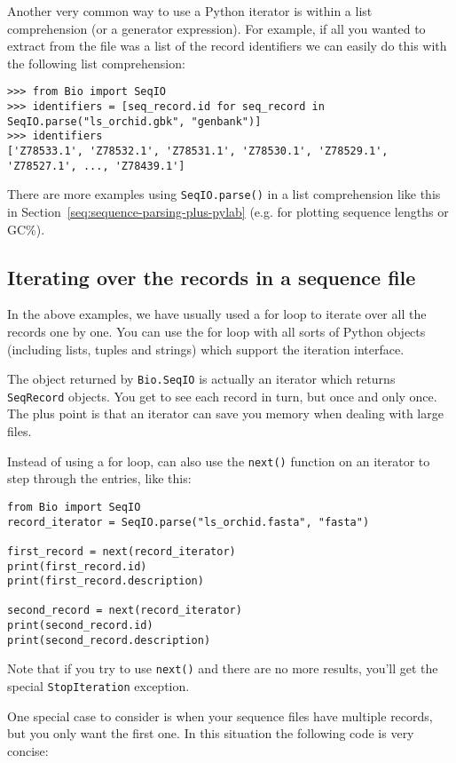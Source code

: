 Another very common way to use a Python iterator is within a list comprehension (or
a generator expression).  For example, if all you wanted to extract from the file was
a list of the record identifiers we can easily do this with the following list comprehension:

\begin{verbatim}
>>> from Bio import SeqIO
>>> identifiers = [seq_record.id for seq_record in SeqIO.parse("ls_orchid.gbk", "genbank")]
>>> identifiers
['Z78533.1', 'Z78532.1', 'Z78531.1', 'Z78530.1', 'Z78529.1', 'Z78527.1', ..., 'Z78439.1']
\end{verbatim}

\noindent There are more examples using \verb|SeqIO.parse()| in a list
comprehension like this in Section~\ref{seq:sequence-parsing-plus-pylab}
(e.g. for plotting sequence lengths or GC\%).

\subsection{Iterating over the records in a sequence file}

In the above examples, we have usually used a for loop to iterate over all the records one by one.  You can use the for loop with all sorts of Python objects (including lists, tuples and strings) which support the iteration interface.

The object returned by \verb|Bio.SeqIO| is actually an iterator which returns \verb|SeqRecord| objects.  You get to see each record in turn, but once and only once.  The plus point is that an iterator can save you memory when dealing with large files.

Instead of using a for loop, can also use the \verb|next()| function on an iterator to step through the entries, like this:

\begin{verbatim}
from Bio import SeqIO
record_iterator = SeqIO.parse("ls_orchid.fasta", "fasta")

first_record = next(record_iterator)
print(first_record.id)
print(first_record.description)

second_record = next(record_iterator)
print(second_record.id)
print(second_record.description)
\end{verbatim}

Note that if you try to use \verb|next()| and there are no more results, you'll get the special \verb|StopIteration| exception.

One special case to consider is when your sequence files have multiple records, but you only want the first one.  In this situation the following code is very concise:


